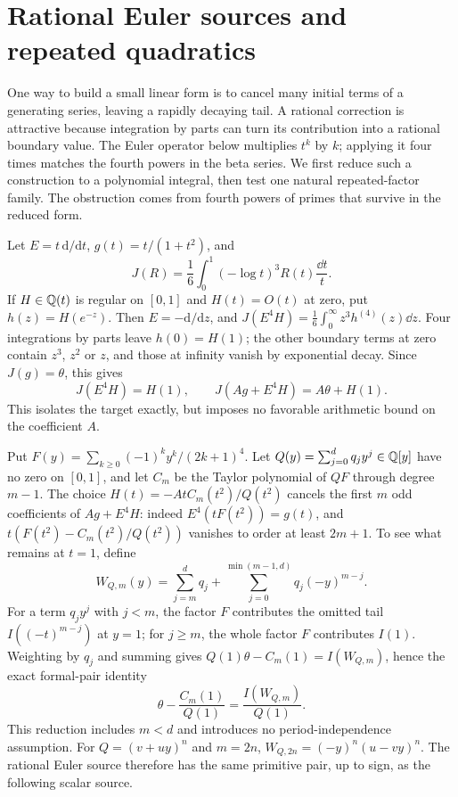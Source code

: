 \section{Rational Euler sources and repeated quadratics}\label{sec:quadratic}
One way to build a small linear form is to cancel many initial terms of
a generating series, leaving a rapidly decaying tail. A rational
correction is attractive because integration by parts can turn its
contribution into a rational boundary value. The Euler operator below
multiplies $t^k$ by $k$; applying it four times matches the fourth powers
in the beta series. We first reduce such a construction to a polynomial
integral, then test one natural repeated-factor family. The obstruction
comes from fourth powers of primes that survive in the reduced form.

Let $E=t\,\mathrm d/\mathrm dt$, $g(t)=t/(1+t^2)$, and
\[
 J(R)=\frac16\int_0^1(-\log t)^3R(t)\frac{\dd t}{t}.
\]
If $H\in\mathbb Q(t)$ is regular on $[0,1]$ and $H(t)=O(t)$ at zero,
put $h(z)=H(e^{-z})$. Then $E=-\mathrm d/\mathrm dz$, and
$J(E^4H)=\frac16\int_0^\infty z^3h^{(4)}(z)\dd z$.
Four integrations by parts leave $h(0)=H(1)$; the other boundary
terms at zero contain $z^3$, $z^2$ or $z$, and those at infinity
vanish by exponential decay. Since $J(g)=\theta$, this gives
\begin{equation}\label{eq:euler-exact}
 J(E^4H)=H(1),\qquad J(Ag+E^4H)=A\theta+H(1).
\end{equation}
This isolates the target exactly, but imposes no favorable arithmetic
bound on the coefficient $A$.

Put $F(y)=\sum_{k\geq0}(-1)^ky^k/(2k+1)^4$. Let
$Q(y)=\sum_{j=0}^d q_jy^j\in\mathbb Q[y]$ have no zero on $[0,1]$, and let $C_m$
be the Taylor polynomial of $QF$ through degree $m-1$. The choice
$H(t)=-AtC_m(t^2)/Q(t^2)$ cancels the first $m$ odd coefficients
of $Ag+E^4H$: indeed $E^4(tF(t^2))=g(t)$, and
$t(F(t^2)-C_m(t^2)/Q(t^2))$ vanishes to order at least $2m+1$.
To see what remains at $t=1$, define
\[
 W_{Q,m}(y)=\sum_{j=m}^d q_j+
                 \sum_{j=0}^{\min(m-1,d)}q_j(-y)^{m-j}.
\]
For a term $q_jy^j$ with $j<m$, the factor $F$ contributes the
omitted tail $I((-t)^{m-j})$ at $y=1$; for $j\geq m$, the
whole factor $F$ contributes $I(1)$. Weighting by $q_j$ and summing gives
$Q(1)\theta-C_m(1)=I(W_{Q,m})$, hence the exact formal-pair identity
\begin{equation}\label{eq:reversal}
 \theta-\frac{C_m(1)}{Q(1)}=\frac{I(W_{Q,m})}{Q(1)}.
\end{equation}
This reduction includes $m<d$ and introduces no period-independence
assumption. For $Q=(v+uy)^n$ and $m=2n$,
$W_{Q,2n}=(-y)^n(u-vy)^n$. The rational Euler source therefore has
the same primitive pair, up to sign, as the following scalar source.

